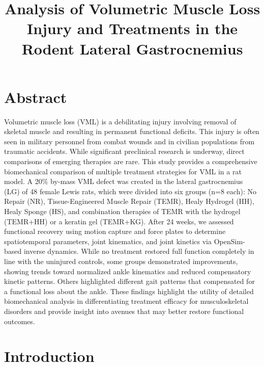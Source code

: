 \documentclass[
]{agujournal2019}
\begin{document}
\title{Analysis of Volumetric Muscle Loss Injury and Treatments in the
Rodent Lateral Gastrocnemius}








\section{Abstract}\label{abstract}

Volumetric muscle loss (VML) is a debilitating injury involving removal
of skeletal muscle and resulting in permanent functional deficits. This
injury is often seen in military personnel from combat wounds and in
civilian populations from traumatic accidents. While significant
preclinical research is underway, direct comparisons of emerging
therapies are rare. This study provides a comprehensive biomechanical
comparison of multiple treatment strategies for VML in a rat model. A
20\% by-mass VML defect was created in the lateral gastrocnemius (LG) of
48 female Lewis rats, which were divided into six groups (n=8 each): No
Repair (NR), Tissue-Engineered Muscle Repair (TEMR), Healy Hydrogel
(HH), Healy Sponge (HS), and combination therapies of TEMR with the
hydrogel (TEMR+HH) or a keratin gel (TEMR+KG). After 24 weeks, we
assessed functional recovery using motion capture and force plates to
determine spatiotemporal parameters, joint kinematics, and joint
kinetics via OpenSim-based inverse dynamics. While no treatment restored
full function completely in line with the uninjured controls, some
groups demonstrated improvements, showing trends toward normalized ankle
kinematics and reduced compensatory kinetic patterns. Others highlighted
different gait patterns that compensated for a functional loss about the
ankle. These findings highlight the utility of detailed biomechanical
analysis in differentiating treatment efficacy for musculoskeletal
disorders and provide insight into avenues that may better restore
functional outcomes.

\section{Introduction}\label{introduction}
\end{document}
